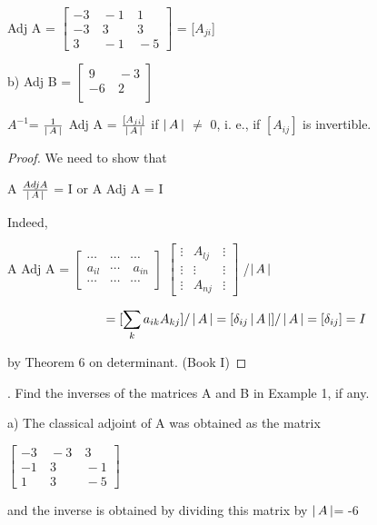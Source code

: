 \documentclass[11pt]{amsbook}
\begin{document}
\begin{center}
Adj A = $\begin{bmatrix} 
-3 &\ -1 &\ 1 \\
-3 &\  3 &\ 3 \\
3 &\ -1 &\ -5
\end{bmatrix}$ = [$A_{ji}$]
\end{center}

b) Adj B =  $\begin{bmatrix} 
9 &\ -3 \\
-6 &\  2 \\
\end{bmatrix}$

\begin{thm} $A^{-1} $= $\frac{1}{\left \lvert \, A \, \right \rvert}$  Adj A = $\frac{[A_{ji}]}{\left \lvert \, A \, \right \rvert}$ if $\left \lvert \, A \, \right \rvert$ $\neq$ 0, i. e., if $[A_{ij}]$ is invertible.
\end{thm}
\begin{proof} We need to show that

\begin{center}
A $\frac{Adj A}{\left \lvert \, A \, \right \rvert}$ = I or A Adj A =  I 
\end{center}
Indeed,
\begin{center}
A Adj A = $\begin{bmatrix} 
\cdots &\cdots &\cdots \\
a_{il} &\cdots &\ a_{in} \\
\cdots &\cdots &\cdots
\end{bmatrix}$
$\begin{bmatrix} 
\vdots & A_{lj} &\vdots \\
\vdots &\vdots &\vdots \\
\vdots & A_{nj} &\vdots
\end{bmatrix}$ /$\left \lvert \, A \, \right \rvert$
\end{center}
\begin{center}
\[=[\sum_{\substack{k}} a_{ik} A_{kj}] /\left \lvert \, A \, \right \rvert = [\delta_{ij}\left \lvert \, A \, \right \rvert]/\left \lvert \, A \, \right \rvert= [\delta_{ij}] = I \]
\end{center}
by Theorem 6 on determinant. (Book I)
\end{proof}
\begin{exmp}. Find the inverses of the matrices A and B in Example 1, if any.
\end{exmp}
\begin{hSolution}

a) The classical adjoint of A was obtained as the matrix
\begin{center}
$\begin{bmatrix} 
-3 &\ -3 &\ 3 \\
-1 &\  3 &\  -1 \\
 1 &\  3 &\ -5
\end{bmatrix}$
\end{center}
and the inverse is obtained by dividing this matrix by $\left \lvert \, A \, \right \rvert$= -6
\end{hSolution}
\end{document}

